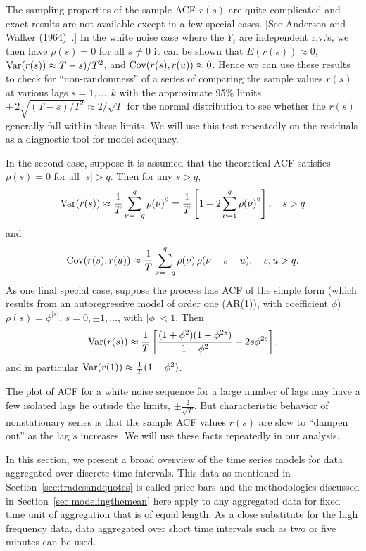 The sampling properties of the sample ACF $r(s)$ are quite complicated and exact results are not available except in a few special cases. [See Anderson and Walker (1964)~\cite{anderwalk}.] In the white noise case where the $Y_t$ are independent r.v.'s, we then have $\rho(s)= 0$ for all $s \neq 0$ it can be shown that $E(r(s)) \approx 0$, $\operatorname{Var}(r(s)) \approx T-s)/T^2$, and $\operatorname{Cov}(r(s), r(u)) \approx 0$. Hence we can use these results to check for ``non-randomness'' of a series of comparing the sample values $r(s)$ at various lags $s=1, \ldots, k$ with the approximate 95\% limits $\pm \, 2 \sqrt{(T-s)/T^2} \approx 2 / \sqrt{T}$ for the normal distribution to see whether the $r(s)$ generally fall within these limits. We will use this test repeatedly on the residuals as a diagnostic tool for model adequacy. 


In the second case, suppose it is assumed that the theoretical ACF satisfies $\rho(s) = 0$ for all $|s| > q$.  Then for any $s > q$,
	\begin{equation} \label{eqn:varrs}
	\var(r(s)) \approx \dfrac{1}{T} \sum_{\nu=-q}^q \rho(\nu)^2= \dfrac{1}{T} \left[ 1 + 2 \sum_{\nu=1}^q \rho(\nu)^2 \right], \quad s > q 
	\end{equation}        
and
	\[
	\operatorname{Cov}(r(s), r(u)) \approx \frac{1}{T} \sum_{\nu = -q}^{q} \rho(\nu)\, \rho(\nu - s + u), \quad s,u > q.
	 \]
As one final special case, suppose the process  has ACF of the simple form (which results from an autoregressive model of order one (AR(1)), with coefficient $\phi$) $\rho(s) = \phi^{|s|}$, $s= 0, \pm 1, \ldots$, with $\lvert \phi \rvert < 1$. Then
	\[
	\operatorname{Var}(r(s)) \approx \frac{1}{T} \left[ \frac{(1 + \phi^2) (1 - \phi^{2s})}{1 - \phi^2} - 2s \phi^{2s} \right],
	\]
and in particular $\operatorname{Var}(r(1)) \approx \frac{1}{T} (1 - \phi^2)$.


The plot of ACF for a white noise sequence for a large number of lags may have a few isolated lags lie outside the limits, $\pm \frac{2}{\sqrt{T}}$. But characteristic behavior of nonstationary series is that the sample ACF values $r(s)$ are slow to ``dampen out'' as the lag $s$ increases. We will use these facts repeatedly in our analysis. 


In this section, we present a broad overview of the time series models for data aggregated over discrete time intervals. This data as mentioned in Section~\ref{sec:tradesandquotes} is called price bars and the methodologies discussed in Section~\ref{sec:modelingthemean} here apply to any aggregated data for fixed time unit of aggregation that is of equal length. As a close substitute for the high frequency data, data aggregated over short time intervals such as two or five minutes can be used. \twomedskip


